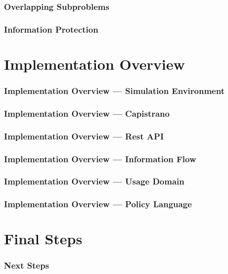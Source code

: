 \documentclass[t,handout, 10pt]{beamer}
\begin{document}
\begin{frame}
\frametitle{Overlapping Subproblems}
\end{frame}

\begin{frame}
\frametitle{Information Protection}
\end{frame}

\section{Implementation Overview}
\begin{frame}
\frametitle{Implementation Overview --- Simulation Environment}
\end{frame}

\begin{frame}
\frametitle{Implementation Overview --- Capistrano}
\end{frame}

\begin{frame}
\frametitle{Implementation Overview --- Rest API}
\end{frame}

\begin{frame}
\frametitle{Implementation Overview --- Information Flow}
\end{frame}

\begin{frame}
\frametitle{Implementation Overview --- Usage Domain}
\end{frame}

\begin{frame}
\frametitle{Implementation Overview --- Policy Language}
\end{frame}

\section{Final Steps}
\begin{frame}
\frametitle{Next Steps}
\end{frame}
\end{document}

